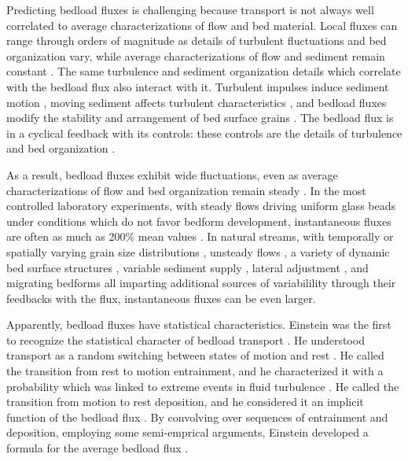 Predicting bedload fluxes is challenging because transport is not always well correlated to average characterizations of flow and bed material. 
Local fluxes can range through orders of magnitude as details of turbulent fluctuations and bed organization vary, while average characterizations of flow and sediment remain constant \citep{Sumer2003, Charru2004, Hassan2008, Venditti2017}.
The same turbulence and sediment organization details which correlate with the bedload flux also interact with it. 
Turbulent impulses induce sediment motion \citep{Valyrakis2010, Celik2014, Amir2014, Shih2017}, moving sediment affects turbulent characteristics \citep{Singh2010, Santos2014, Liu2016}, and bedload fluxes modify the stability and arrangement of bed surface grains \citep{Kirchener1990, Charru2004, Hassan2008}.
The bedload flux is in a cyclical feedback with its controls: these controls are the details of turbulence and bed organization \citep{Jerolmack2005}. 

As a result, bedload fluxes exhibit wide fluctuations, even as average characterizations of flow and bed organization remain steady \citep{Ancey2014}.
In the most controlled laboratory experiments, with steady flows driving uniform glass beads under conditions which do not favor bedform development, instantaneous fluxes are often as much as 200\% mean values \citep{Bohm2004, Ancey2008, Heyman2014, Heyman2016}. 
In natural streams, with temporally or spatially varying grain size distributions \citep{Lisle1992, Chen2008}, unsteady flows \citep{Mao2012, FerrerBoix2015}, a variety of dynamic bed surface structures \citep{Hassan2008, Venditti2017}, variable sediment supply \citep{Madej2009, Elgueta2018}, lateral adjustment \citep{Pitlick2013, Redolfi2018}, and migrating bedforms \citep{Gomez1989, Dhont2018} all imparting additional sources of variabilility through their feedbacks with the flux, instantaneous fluxes can be even larger. 

Apparently, bedload fluxes have statistical characteristics.
Einstein was the first to recognize the statistical character of bedload transport \citep{Einstein1937}. 
He understood transport as a random switching between states of motion and rest \citep{Einstein1942, Einstein1950}. 
He called the transition from rest to motion entrainment, and he characterized it with a probability which was linked to extreme events in fluid turbulence \citep{Einstein1949, Einstein1950}. 
He called the transition from motion to rest deposition, and he considered it an implicit function of the bedload flux \citep{Einstein1942, Einstein1950}. 
By convolving over sequences of entrainment and deposition, employing some semi-emprical arguments, Einstein developed a formula for the average bedload flux \citep{Einstein1950}. 


